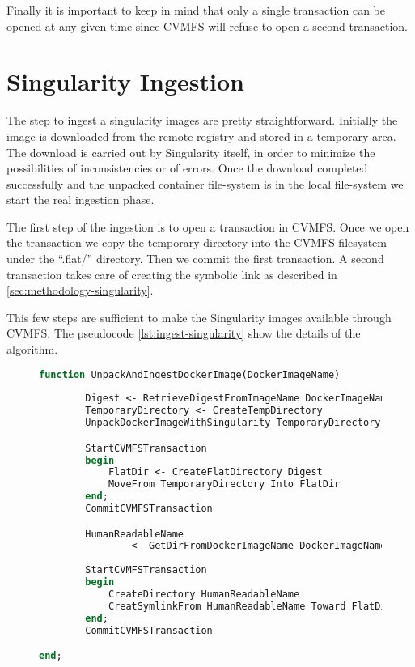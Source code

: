 Finally it is important to keep in mind that only a single transaction can be
opened at any given time since CVMFS will refuse to open a second transaction. 

\section{Singularity Ingestion}

The step to ingest a singularity images are pretty straightforward. Initially
the image is downloaded from the remote registry and stored in a temporary
area. The download is carried out by Singularity itself, in order to minimize
the possibilities of inconsistencies or of errors. Once the download completed
successfully and the unpacked container file-system is in the local file-system
we start the real ingestion phase.

The first step of the ingestion is to open a transaction in CVMFS. Once we open
the transaction we copy the temporary directory into the CVMFS filesystem under
the “.flat/” directory. Then we commit the first transaction. A second
transaction takes care of creating the symbolic link as described in
\ref{sec:methodology-singularity}.

This few steps are sufficient to make the Singularity images available through
CVMFS. The pseudocode \ref{lst:ingest-singularity} show the details of the
algorithm.

\begin{figure}
\begin{lstlisting}[language=Pascal,caption={Algorithm to unpack a Docker image with Singularity and ingest it into CVMFS}, label={lst:ingest-singularity}]
function UnpackAndIngestDockerImage(DockerImageName)
        
        Digest <- RetrieveDigestFromImageName DockerImageName
        TemporaryDirectory <- CreateTempDirectory
        UnpackDockerImageWithSingularity TemporaryDirectory

        StartCVMFSTransaction
        begin
            FlatDir <- CreateFlatDirectory Digest
            MoveFrom TemporaryDirectory Into FlatDir
        end;
        CommitCVMFSTransaction

        HumanReadableName 
                <- GetDirFromDockerImageName DockerImageName
        
        StartCVMFSTransaction
        begin
            CreateDirectory HumanReadableName
            CreatSymlinkFrom HumanReadableName Toward FlatDir
        end;
        CommitCVMFSTransaction

end;
\end{lstlisting}
\end{figure}

